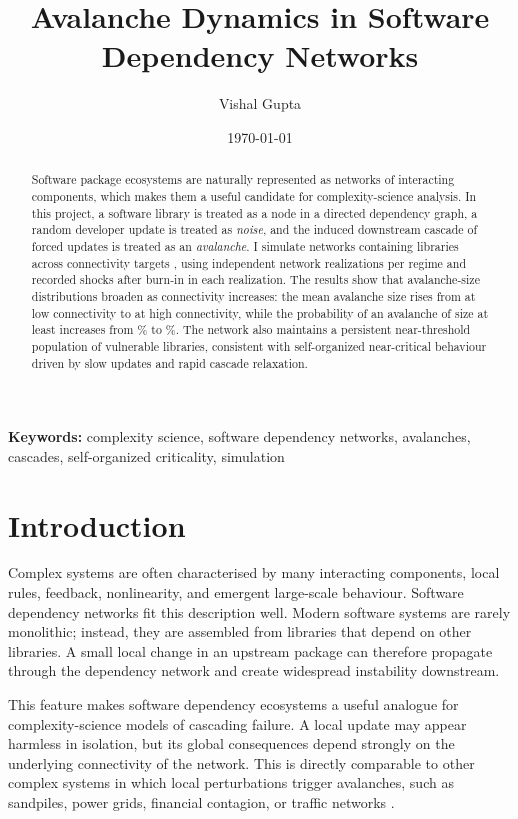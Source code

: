 \documentclass[11pt]{article}
\title{Avalanche Dynamics in Software Dependency Networks}
\author{Vishal Gupta}
\date{\today}
\begin{document}
\maketitle

\begin{abstract}
Software package ecosystems are naturally represented as networks of interacting components, which makes them a useful candidate for complexity-science analysis. In this project, a software library is treated as a node in a directed dependency graph, a random developer update is treated as \emph{noise}, and the induced downstream cascade of forced updates is treated as an \emph{avalanche}. I simulate networks containing \NodeCount{} libraries across connectivity targets \ConnectivityTargets{}, using \ReplicateCount{} independent network realizations per regime and \RecordedShocks{} recorded shocks after burn-in in each realization. The results show that avalanche-size distributions broaden as connectivity increases: the mean avalanche size rises from \MeanAvalancheLow{} at low connectivity to \MeanAvalancheHigh{} at high connectivity, while the probability of an avalanche of size at least \LargeAvalancheThreshold{} increases from \LargeProbLow{}\% to \LargeProbHigh{}\%. The network also maintains a persistent near-threshold population of vulnerable libraries, consistent with self-organized near-critical behaviour driven by slow updates and rapid cascade relaxation.
\end{abstract}

\noindent\textbf{Keywords:} complexity science, software dependency networks, avalanches, cascades, self-organized criticality, simulation

\section{Introduction}
Complex systems are often characterised by many interacting components, local rules, feedback, nonlinearity, and emergent large-scale behaviour. Software dependency networks fit this description well. Modern software systems are rarely monolithic; instead, they are assembled from libraries that depend on other libraries. A small local change in an upstream package can therefore propagate through the dependency network and create widespread instability downstream.

This feature makes software dependency ecosystems a useful analogue for complexity-science models of cascading failure. A local update may appear harmless in isolation, but its global consequences depend strongly on the underlying connectivity of the network. This is directly comparable to other complex systems in which local perturbations trigger avalanches, such as sandpiles, power grids, financial contagion, or traffic networks \citep{bak1987,newman2003,albert2002}.
\end{document}

